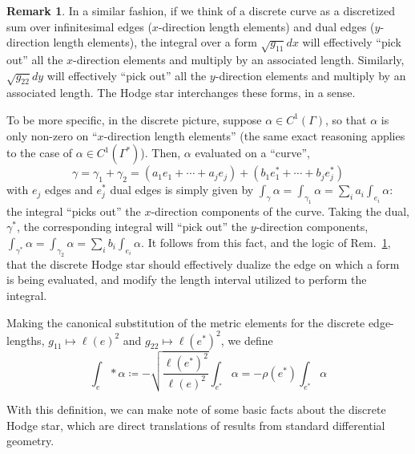 \documentclass[aps,pra,showpacs,notitlepage,onecolumn,superscriptaddress,nofootinbib]{revtex4-1}
\theoremstyle{definition}
\newtheorem{remark}{Remark}[section]
\newcommand{\hhrulefill}{\hspace{-1.5em} \hrulefill}
\begin{document}
\hhrulefill

\begin{remark}
  \label{rem:a}
In a similar fashion, if we think of a discrete curve as a discretized sum over infinitesimal edges ($x$-direction length elements) and dual edges ($y$-direction length elements),
the integral over a form $\sqrt{g_{11}} dx$ will effectively ``pick out'' all the $x$-direction elements and multiply by an associated length. Similarly,
$\sqrt{g_{22}} dy$ will effectively ``pick out'' all the $y$-direction elements and multiply by an associated length. The Hodge star interchanges these forms, in a sense.
\end{remark}

\hhrulefill

\noindent To be more specific, in the discrete picture, suppose $\alpha \in C^{1}(\Gamma)$, so that $\alpha$ is only non-zero on ``$x$-direction length elements'' (the same exact reasoning
applies to the case of $\alpha \in C^{1}(\Gamma^{*})$). Then, $\alpha$ evaluated on a ``curve'',
\begin{equation}
  \gamma = \gamma_1 + \gamma_2 = (a_1 e_1 + \cdots + a_j e_j) + (b_1 e^{*}_1 + \cdots + b_j e_j^{*})
\end{equation}
with $e_j$ edges and $e_j^{*}$ dual edges is simply given by $\int_{\gamma} \alpha = \int_{\gamma_1} \alpha = \sum_{i} a_i \int_{e_i} \alpha$: the integral ``picks out'' the $x$-direction components
of the curve. Taking the dual, $\gamma^{*}$, the corresponding integral will ``pick out'' the $y$-direction components, $\int_{\gamma^{*}} \alpha = \int_{\gamma_2} \alpha = \sum_{i} b_i \int_{e_i} \alpha$.
It follows from this fact, and the logic of Rem.~\ref{rem:a}, that the discrete Hodge star should effectively dualize the edge on which a form is being evaluated, and modify the length interval utilized to perform the integral.

Making the canonical substitution of the metric elements for the discrete edge-lengths, $g_{11} \mapsto \ell(e)^2$ and $g_{22} \mapsto \ell(e^{*})^2$, we define
\begin{equation}
  \displaystyle\int_{e} * \alpha \coloneqq - \sqrt{\frac{\ell(e^{*})^2}{\ell(e)^2}} \displaystyle\int_{e^{*}} \alpha = - \rho(e^{*}) \displaystyle\int_{e^{*}} \alpha
  \end{equation}

\noindent With this definition, we can make note of some basic facts about the discrete Hodge star, which are direct translations of results from standard differential geometry.
\end{document}
